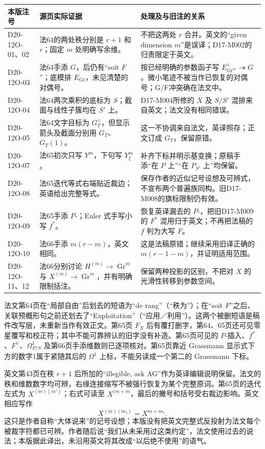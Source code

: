 \documentclass[UTF8,a4paper]{ctexbook}
\newcommand{\Gr}{\operatorname{Gr}}
\begin{document}
\begin{longtable}{@{}p{.18\linewidth}p{.33\linewidth}p{.40\linewidth}@{}}
\toprule
本版注号 & 源页实际证据 & 处理及与旧注的关系\\
\midrule
\endhead
D20-12O-01、02 & 法64的两处秩分别是 $r+1$ 和 $r$；固定 $m$ 处明确写余维。 & 不把这两处 $r$ 合并。英文的“given dimension $m$”是误译；D17-M002的归责限定于英文。\\
D20-12O-03 & 法64手添 $G$，后仍有“soit $F$”；底模排 $E_{\Gr}$，未见清楚的对偶号。 & 按已经明确的参数函子写 $E^\vee_{\Gr^m}\twoheadrightarrow G$。微小笔迹不被当作已恢复的对偶号；G/F冲突确在法文中。\\
D20-12O-04 & 法64两次乘积的底标为 $S$；截面与线性子簇均在 $S'$ 上。 & D17-M004所修的 $X$ 及 $S/S'$ 混排来自英文；法文没有相同错误。\\
D20-12O-05 & 法64文字目标为 $G_T^\vee$，但显示箭头及截面分别用 $G_T$、$G_T(1)$。 & 这一不协调来自法文，英译照存；正文订成 $G_T$，保留原错。\\
D20-12O-07 & 法65初次只写 $Y^m$，下句写 $Y^m_\xi$。 & 补齐下标并明示基变换；原稿手添“在 $P$ 上”“在 $P_{S'}$ 上”均保留。\\
D20-12O-08 & 法65迭代等式右端贴近裁边；英语给出完整等式。 & 保存作者的近似记号设想及可辨式，不宣布两个普遍族同构。旧D17-M008的旗标限制仍有效。\\
D20-12O-09 & 法65手添 $P$-；Euler 式手写小写 $f^*$。 & 恢复英译漏去的 $P$-，把旧D17-M009的 $F^*$ 混用归于英文；不再把法稿的 $f$ 判为大写 $F$。\\
D20-12O-10 & 法66手添 $m(r-m)$，英文相同。 & 这是法稿原错；继续采用旧译正确的 $m(r-1-m)$，并证明适用范围。\\
D20-12O-11、12 & 法66分别讨论 $H^{(m)}\to\Gr^m$ 与 $X^{(m)}\to\Gr^m$，并有明确限制括注。 & 保留两种投影的区别，不把对 $X$ 的光滑性转移到参数空间。\\
\bottomrule
\end{longtable}

法文第64页在“局部自由”后划去的短语为“de rang”（“秩为”）；在“soit $F$”之后、关联预概形句之前还划去了“Exploitation”（“应用／利用”）。这两个被删短语是稿件改写层，未重新当作有效正文。第65页 $F_X$ 后有覆打删字，第64、65页还可见零星覆写和校正符；其中不能可靠辨认的旧字没有补造。第65页可见的 $P$-插入、$f^*$、$F^\vee$、$\Omega^1_{P/S}$ 及第66页手添维数则已逐项核对。第65页靠近 Grassmann 显示式下方的数字1属于紧随其后的 $\Omega^1$ 上标，不能另读成一个第二的 Grassmann 下标。

英文第43页在秩 $r+1$ 后所加的“illegible, ask AG”作为英译编辑说明保留。法文的秩和维数数字均可辨，右缘连接缩写不被强行恢复为某个完整原词。第65页的迭代左式为 $X^{(m)(m')}$；右式可读至 $X^{(m+m}$，最后的撇号和括号受右裁边影响。英文相应写作
\[
X^{(m)(m_1)}=X^{m+m_1}.
\]
这只是作者自称“大体说来”的记号设想；本版没有把英文完整式反投射为法文每个被裁字符都已可辨。作者随后说“我们从未采用过这类约定”，法文使用过去的说法；本版据此译出，未沿用英文将其改成“以后绝不使用”的语气。
\end{document}
